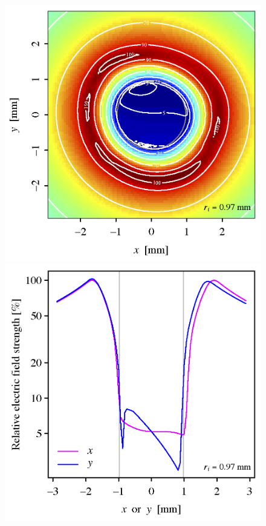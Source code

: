 \documentclass[%
 reprint,
 amsmath,amssymb,
 aps,
prstab,
]{revtex4-1}
\begin{document}
\begin{figure}[h]
	\begin{minipage}[t]{0.49\linewidth}
		\centering
		\includegraphics[width=1.0\linewidth]{CHG1b_170512_8p75A_2-4-2p7kG_500V_76mA_hires_Emap.png}
	\end{minipage}
	\begin{minipage}[t]{0.49\linewidth}
		\centering
		\includegraphics[width=1.0\linewidth]{CHG1b_170512_8p75A_2-4-2p7kG_500V_76mA_hires_Eslice.png}

\end{minipage}
\end{figure}
\end{document}
